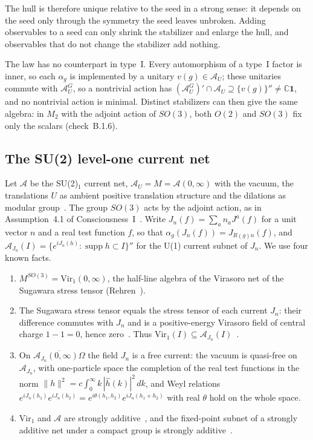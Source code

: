 \documentclass[12pt]{article}
\theoremstyle{definition}
\theoremstyle{remark}
\newcommand{\Vir}{\mathrm{Vir}}
\newcommand{\AU}{\mathcal A_U}
\begin{document}
The hull is therefore unique relative to the seed in a strong sense: it depends on the
seed only through the symmetry the seed leaves unbroken. Adding observables to a seed
can only shrink the stabilizer and enlarge the hull, and observables that do not change
the stabilizer add nothing.

The law has no counterpart in type~I. Every automorphism of a
type~I factor is inner, so each \(\alpha_g\) is implemented by a unitary \(v(g)\in\AU\); these unitaries
commute with \(\AU^G\), so a nontrivial action has
\((\AU^G)'\cap\AU\supseteq\{v(g)\}''\neq\mathbb C\mathbf 1\), and no nontrivial action is
minimal. Distinct stabilizers can then give the same algebra: in
\(M_2\) with the adjoint action of \(SO(3)\), both \(O(2)\) and \(SO(3)\) fix only the
scalars (check~B.1.6).

\subsection{The SU(2) level-one current net}

Let \(\mathcal A\) be the SU(2)\(_1\) current net, \(\AU=M=\mathcal A(0,\infty)\) with the
vacuum, the translations \(U\) as ambient positive translation structure and the dilations as modular
group~\cite{BGL}. The group \(SO(3)\) acts by the adjoint action, as in Assumption~4.1 of
Consciousness~I~\cite{PaperI}. Write \(J_n(f)=\sum_an_aJ^a(f)\) for a unit vector \(n\)
and a real test function \(f\), so that \(\alpha_g(J_n(f))=J_{R(g)n}(f)\), and
\(\mathcal A_{J_n}(I)=\{e^{iJ_n(h)}:\operatorname{supp}h\subset I\}''\) for the U(1) current
subnet of \(J_n\). We use four known facts.
\begin{enumerate}[label=(F\arabic*),leftmargin=2.5em]
\item \(M^{SO(3)}=\Vir_1(0,\infty)\), the half-line algebra of the Virasoro net of the
  Sugawara stress tensor (Rehren~\cite{Rehren}).
\item The Sugawara stress tensor equals the stress tensor of each current
  \(J_n\): their difference commutes with \(J_n\) and is a positive-energy Virasoro field
  of central charge \(1-1=0\), hence zero~\cite{GKO1986}. Thus
  \(\Vir_1(I)\subseteq\mathcal A_{J_n}(I)\)~\cite{Carpi1999}.
\item On \(\overline{\mathcal A_{J_n}(0,\infty)\Omega}\) the field \(J_n\) is a free
  current: the vacuum is quasi-free on \(\mathcal A_{J_n}\), with one-particle space the
  completion of the real test functions in the norm
  \(\|h\|^2=c\int_0^\infty k\,|\hat h(k)|^2\,dk\), and Weyl relations
  \(e^{iJ_n(h_1)}e^{iJ_n(h_2)}=e^{i\theta(h_1,h_2)}e^{iJ_n(h_1+h_2)}\) with real
  \(\theta\) hold on the whole space.
\item \(\Vir_1\) and \(\mathcal A\) are strongly additive~\cite{Carpi,Xu}, and the
  fixed-point subnet of a strongly additive net under a compact group is strongly
  additive~\cite{Xu}.
\end{enumerate}
\end{document}
